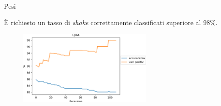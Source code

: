 \documentclass{beamer}
\begin{document}
\begin{frame}{Pesi}
\begin{center}
È richiesto un tasso di {\em shake} correttamente classificati 
superiore al $98\%$.
\end{center}
\begin{figure}[H]
\includegraphics[width=0.6\textwidth]{../figure/acc-vs-veripos-qda.png}  
\end{figure}

\end{frame}
\end{document}
